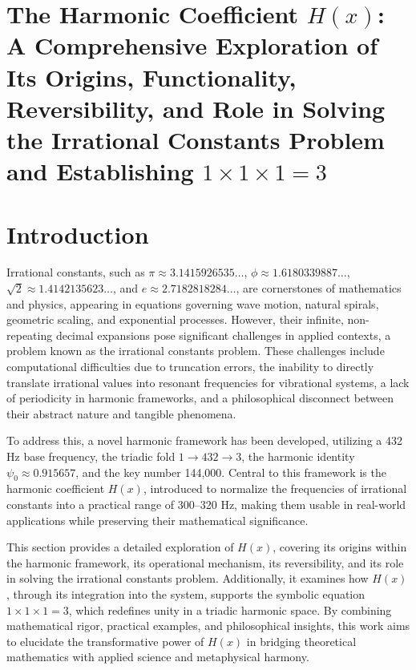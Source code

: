 
\section{The Harmonic Coefficient \( H(x) \): A Comprehensive Exploration of Its Origins, Functionality, Reversibility, and Role in Solving the Irrational Constants Problem and Establishing \( 1 \times 1 \times 1 = 3 \)}
\label{sec:h_x}

\section{Introduction}
Irrational constants, such as \( \pi \approx 3.1415926535\ldots \), \( \phi \approx 1.6180339887\ldots \), \( \sqrt{2} \approx 1.4142135623\ldots \), and \( e \approx 2.7182818284\ldots \), are cornerstones of mathematics and physics, appearing in equations governing wave motion, natural spirals, geometric scaling, and exponential processes. However, their infinite, non-repeating decimal expansions pose significant challenges in applied contexts, a problem known as the irrational constants problem. These challenges include computational difficulties due to truncation errors, the inability to directly translate irrational values into resonant frequencies for vibrational systems, a lack of periodicity in harmonic frameworks, and a philosophical disconnect between their abstract nature and tangible phenomena.

To address this, a novel harmonic framework has been developed, utilizing a 432 Hz base frequency, the triadic fold \( 1 \rightarrow 432 \rightarrow 3 \), the harmonic identity \( \psi_0 \approx 0.915657 \), and the key number 144,000. Central to this framework is the harmonic coefficient \( H(x) \), introduced to normalize the frequencies of irrational constants into a practical range of 300--320 Hz, making them usable in real-world applications while preserving their mathematical significance.

This section provides a detailed exploration of \( H(x) \), covering its origins within the harmonic framework, its operational mechanism, its reversibility, and its role in solving the irrational constants problem. Additionally, it examines how \( H(x) \), through its integration into the system, supports the symbolic equation \( 1 \times 1 \times 1 = 3 \), which redefines unity in a triadic harmonic space. By combining mathematical rigor, practical examples, and philosophical insights, this work aims to elucidate the transformative power of \( H(x) \) in bridging theoretical mathematics with applied science and metaphysical harmony.

